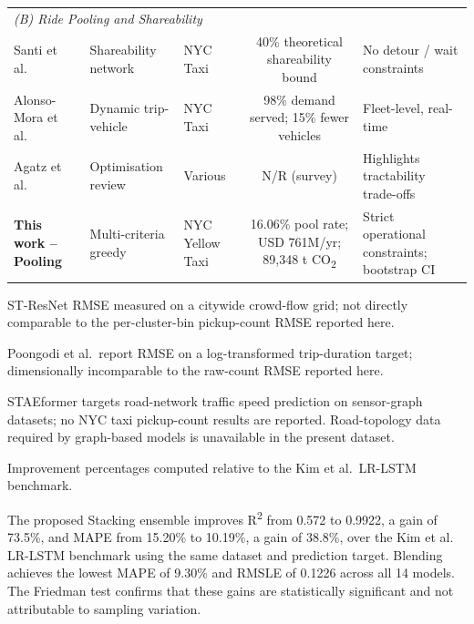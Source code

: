 \documentclass[a4paper,fleqn]{cas-dc}
\begin{document}
\begin{table}[t]
\begin{threeparttable}
\begin{tabular}{@{}p{2.6cm}p{2.0cm}p{2.2cm}rrrp{2.8cm}@{}}
\multicolumn{7}{l}{\textit{(B) Ride Pooling and Shareability}} \\[2pt]
Santi et al.~\cite{santi2014quantifying} & Shareability network & NYC Taxi &
  \multicolumn{3}{c}{40\% theoretical shareability bound} &
  No detour / wait constraints \\
Alonso-Mora et al.~\cite{alonso2017demand} & Dynamic trip-vehicle & NYC Taxi &
  \multicolumn{3}{c}{98\% demand served; 15\% fewer vehicles} &
  Fleet-level, real-time \\
Agatz et al.~\cite{agatz2012ridesharing} & Optimisation review & Various &
  \multicolumn{3}{c}{N/R (survey)} &
  Highlights tractability trade-offs \\
\textbf{This work -- Pooling} & Multi-criteria greedy & NYC Yellow Taxi &
  \multicolumn{3}{c}{16.06\% pool rate; USD 761M/yr; 89{,}348 t CO\textsubscript{2}} &
  Strict operational constraints; bootstrap CI \\
\bottomrule
\end{tabular}
\begin{tablenotes}
  \small
  \item[$\dagger$] ST-ResNet RMSE measured on a citywide crowd-flow grid; not directly comparable to the per-cluster-bin pickup-count RMSE reported here.
  \item[$\ddagger$] Poongodi et al.\ report RMSE on a log-transformed trip-duration target; dimensionally incomparable to the raw-count RMSE reported here.
  \item[$\S$] STAEformer targets road-network traffic speed prediction on sensor-graph datasets; no NYC taxi pickup-count results are reported.  Road-topology data required by graph-based models is unavailable in the present dataset.
  \item Improvement percentages computed relative to the Kim et al.\ LR-LSTM benchmark.
\end{tablenotes}
\end{threeparttable}
\end{table}

The proposed Stacking ensemble improves R\textsuperscript{2} from 0.572 to 0.9922, a gain of 73.5\%, and MAPE from 15.20\% to 10.19\%, a gain of 38.8\%, over the Kim et al.~\cite{kim2020hybrid} LR-LSTM benchmark using the same dataset and prediction target.  Blending achieves the lowest MAPE of 9.30\% and RMSLE of 0.1226 across all 14 models.  The Friedman test confirms that these gains are statistically significant and not attributable to sampling variation.
\end{document}
